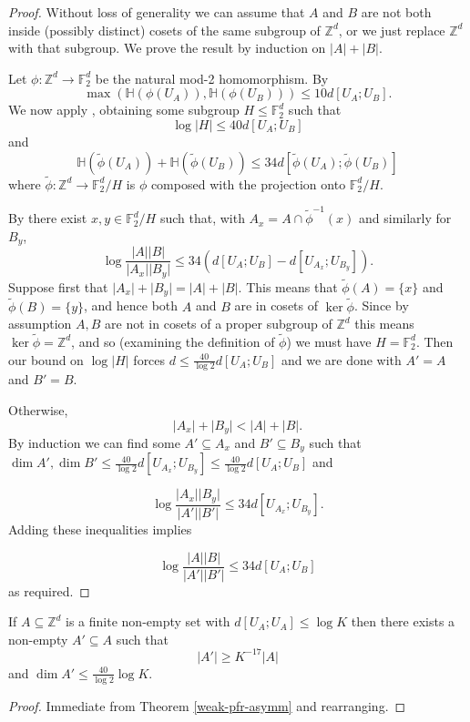 \begin{proof}
\leanok
Without loss of generality we can assume that $A$ and $B$ are not both inside (possibly distinct) cosets of the same subgroup of $\mathbb{Z}^d$, or we just replace $\mathbb{Z}^d$ with that subgroup. We prove the result by induction on $\lvert A\rvert+\lvert B\rvert$.

Let $\phi:\mathbb{Z}^d\to \mathbb{F}_2^d$ be the natural mod-2 homomorphism. By 
\[\max(\mathbb{H}(\phi(U_A)),\mathbb{H}(\phi(U_B)))\leq 10d[U_A;U_B].\]
We now apply , obtaining some subgroup $H\leq \mathbb{F}_2^d$ such that
\[\log \lvert H\rvert \leq 40d[U_A;U_B]\]
and
\[\mathbb{H}(\tilde{\phi}(U_A))+\mathbb{H}(\tilde{\phi}(U_B))\leq 34 d[\tilde{\phi}(U_A);\tilde{\phi}(U_B)]\]
where $\tilde{\phi}:\mathbb{Z}^d\to \mathbb{F}_2^d/H$ is $\phi$ composed with the projection onto $\mathbb{F}_2^d/H$.


By  there exist $x,y\in \mathbb{F}_2^d/H$ such that, with $A_x=A\cap \tilde{\phi}^{-1}(x)$ and similarly for $B_y$,
\[\log \frac{\lvert A\rvert\lvert B\rvert}{\lvert A_x\rvert\lvert B_y\rvert}\leq 34(d[U_A;U_B]-d[U_{A_x};U_{B_y}]).\]
Suppose first that $\lvert A_x\rvert+\lvert B_y\rvert=\lvert A\rvert+\lvert B\rvert$. This means that $\tilde{\phi}(A)=\{x\}$ and $\tilde{\phi}(B)=\{y\}$, and hence both $A$ and $B$ are in cosets of $\ker \tilde{\phi}$. Since by assumption $A,B$ are not in cosets of a proper subgroup of $\mathbb{Z}^d$ this means $\ker\tilde{\phi}=\mathbb{Z}^d$, and so (examining the definition of $\tilde{\phi}$) we must have $H=\mathbb{F}_2^d$. Then our bound on $\log\lvert H\rvert$ forces $d\leq \frac{40}{\log 2}d[U_A;U_B]$ and we are done with $A'=A$ and $B'=B$.

Otherwise,
\[\lvert A_x\rvert+\lvert B_y\rvert <\lvert A\rvert+\lvert B\rvert.\]
By induction we can find some $A'\subseteq A_x$ and $B'\subseteq B_y$ such that $\dim A',\dim B'\leq \frac{40}{\log 2} d[U_{A_x};U_{B_y}]\leq \frac{40}{\log 2}d[U_A;U_B]$ and

\[\log \frac{\lvert A_x\rvert\lvert B_y\rvert}{\lvert A'\rvert\lvert B'\rvert}\leq 34d[U_{A_x};U_{B_y}].\]
Adding these inequalities implies

\[\log\frac{\lvert A\rvert\lvert B\rvert}{\lvert A'\rvert\lvert B'\rvert}\leq 34d[U_A;U_B]\]
as required.
\end{proof}

\begin{theorem}\label{weak-pfr-symm}\leanok
If $A\subseteq \mathbb{Z}^d$ is a finite non-empty set with $d[U_A;U_A]\leq \log K$ then there exists a non-empty $A'\subseteq A$ such that
\[\lvert A'\rvert\geq K^{-17}\lvert A\rvert\]
and $\dim A'\leq \frac{40}{\log 2} \log K$.
\end{theorem}
\begin{proof}
\leanok
Immediate from Theorem \ref{weak-pfr-asymm} and rearranging.
\end{proof}

